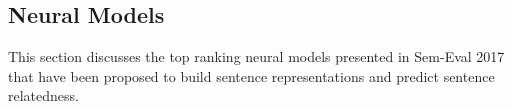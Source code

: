 \documentclass[12pt]{report} %
\begin{document}
%
%

\subsection{Neural Models}
\label{nu_models_rw} 

This section discusses the top ranking neural models presented in Sem-Eval 2017 that have been proposed to build sentence representations and predict sentence relatedness.
\end{document}
